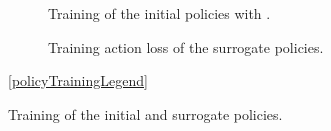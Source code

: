 \newcommand{\PolicyTrainingSubfigCaptionSkip}{-0.4cm} %
\newcommand{\PolicyTrainingSubfigSpacing}{0.4cm}   %
\newcommand{\PolicyTrainingSubfigLegendSpacing}{0.2cm} %
\newcommand{\PolicyTrainingSubfigHeight}{0.4\linewidth} %

\begin{figure}[t]
    \centering
    \begin{subfigure}[b]{\textwidth}
        \centering
        \captionsetup{skip=\PolicyTrainingSubfigCaptionSkip}
        
        \caption{Training of the initial policies with .}
        \label{fig:initial_policy_training}
    \end{subfigure}

    \vspace{\PolicyTrainingSubfigSpacing}

    \begin{subfigure}[b]{\textwidth}
        \centering
        \captionsetup{skip=\PolicyTrainingSubfigCaptionSkip}
        
        \caption{Training action loss of the surrogate policies.}
        \label{fig:surrogate_policy_training}
    \end{subfigure}

    \vspace{\PolicyTrainingSubfigLegendSpacing}
    {\ref{policyTrainingLegend}}
    \caption{Training of the initial and surrogate policies.}
    \label{fig:policy_training}
\end{figure}
